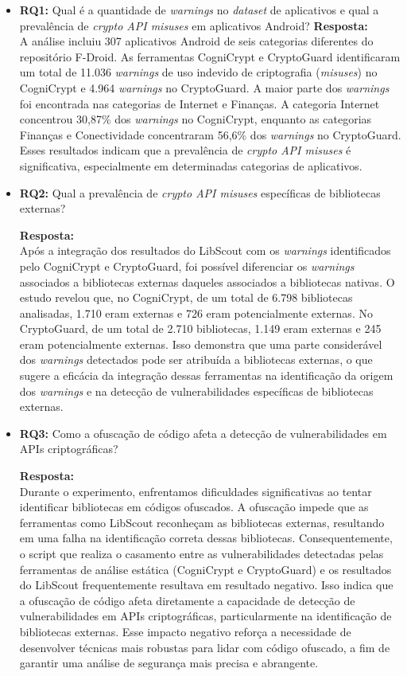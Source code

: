 \begin{itemize}
\item \textbf{RQ1:} Qual é a quantidade de \textit{warnings} no \textit{dataset} de aplicativos e qual a prevalência de \textit{crypto API misuses} em aplicativos Android?
\textbf{Resposta:} \\
A análise incluiu 307 aplicativos Android de seis categorias diferentes do repositório F-Droid. As ferramentas CogniCrypt e CryptoGuard identificaram um total de 11.036 \textit{warnings} de uso indevido de criptografia (\textit{misuses}) no CogniCrypt e 4.964 \textit{warnings} no CryptoGuard. A maior parte dos \textit{warnings} foi encontrada nas categorias de Internet e Finanças. A categoria Internet concentrou 30,87\% dos \textit{warnings} no CogniCrypt, enquanto as categorias Finanças e Conectividade concentraram 56,6\% dos \textit{warnings} no CryptoGuard. Esses resultados indicam que a prevalência de \textit{crypto API misuses} é significativa, especialmente em determinadas categorias de aplicativos.

\item \textbf{RQ2:} Qual a prevalência de \textit{crypto API misuses} específicas de bibliotecas externas?

\textbf{Resposta:} \\
Após a integração dos resultados do LibScout com os \textit{warnings} identificados pelo CogniCrypt e CryptoGuard, foi possível diferenciar os \textit{warnings} associados a bibliotecas externas daqueles associados a bibliotecas nativas. O estudo revelou que, no CogniCrypt, de um total de 6.798 bibliotecas analisadas, 1.710 eram externas e 726 eram potencialmente externas. No CryptoGuard, de um total de 2.710 bibliotecas, 1.149 eram externas e 245 eram potencialmente externas. Isso demonstra que uma parte considerável dos \textit{warnings} detectados pode ser atribuída a bibliotecas externas, o que sugere a eficácia da integração dessas ferramentas na identificação da origem dos \textit{warnings} e na detecção de vulnerabilidades específicas de bibliotecas externas.

\item \textbf{RQ3:} Como a ofuscação de código afeta a detecção de vulnerabilidades em APIs criptográficas?

\textbf{Resposta:} \\
Durante o experimento, enfrentamos dificuldades significativas ao tentar identificar bibliotecas em códigos ofuscados. A ofuscação impede que as ferramentas como LibScout reconheçam as bibliotecas externas, resultando em uma falha na identificação correta dessas bibliotecas. Consequentemente, o script que realiza o casamento entre as vulnerabilidades detectadas pelas ferramentas de análise estática (CogniCrypt e CryptoGuard) e os resultados do LibScout frequentemente resultava em resultado negativo. Isso indica que a ofuscação de código afeta diretamente a capacidade de detecção de vulnerabilidades em APIs criptográficas, particularmente na identificação de bibliotecas externas. Esse impacto negativo reforça a necessidade de desenvolver técnicas mais robustas para lidar com código ofuscado, a fim de garantir uma análise de segurança mais precisa e abrangente.


\end{itemize}

